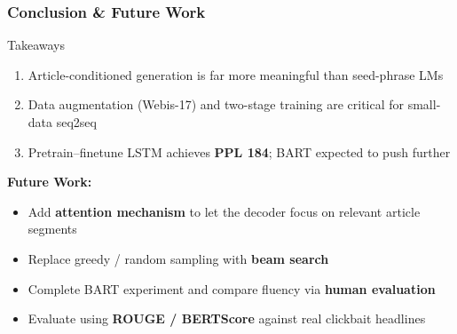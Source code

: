 \documentclass{beamer}
\begin{document}
\begin{frame}
\frametitle{Conclusion \& Future Work}

\begin{block}{Takeaways}
\begin{enumerate}
    \item Article-conditioned generation is far more meaningful than seed-phrase LMs
    \item Data augmentation (Webis-17) and two-stage training are critical for small-data seq2seq
    \item Pretrain--finetune LSTM achieves \textbf{PPL 184}; BART expected to push further
\end{enumerate}
\end{block}

\vspace{0.3cm}

\textbf{Future Work:}
\begin{itemize}
    \item Add \textbf{attention mechanism} to let the decoder focus on relevant article segments
    \item Replace greedy / random sampling with \textbf{beam search}
    \item Complete BART experiment and compare fluency via \textbf{human evaluation}
    \item Evaluate using \textbf{ROUGE / BERTScore} against real clickbait headlines
\end{itemize}

\end{frame}
\end{document}

